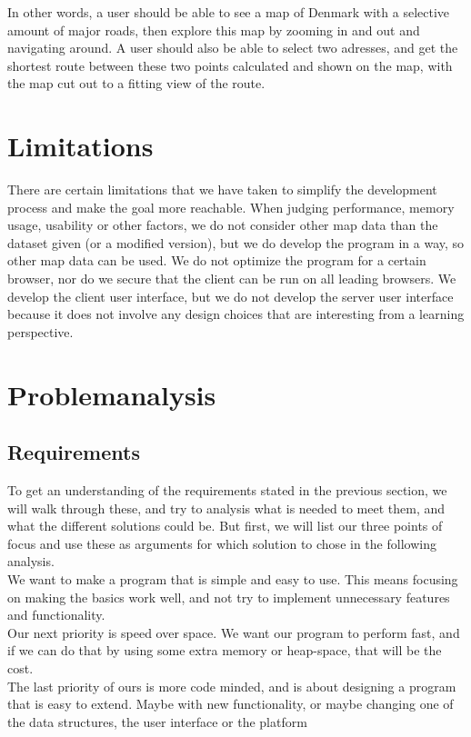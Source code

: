 \documentclass[a4paper,10pt,titlepage]{article}
\begin{document}
		In other words, a user should be able to see a map of Denmark with a selective amount of major roads, then explore this map by zooming in and out and navigating around. A user should also be able to select two adresses, and get the shortest route between these two points calculated and shown on the map, with the map cut out to a fitting view of the route.
		 
	\newpage
	\section{Limitations}
		
		There are certain limitations that we have taken to simplify the development process and make the goal more reachable. When judging performance, memory usage, usability or other factors, we do not consider other map data than the dataset given (or a modified version), but we do develop the program in a way, so other map data can be used. We do not optimize the program for a certain browser, nor do we secure that the client can be run on all leading browsers. We develop the client user interface, but we do not develop the server user interface because it does not involve any design choices that are interesting from a learning perspective.


	\section{Problemanalysis}
		\subsection{Requirements}
To get an understanding of the requirements stated in the previous section, we will walk through these, and try to analysis what is needed to meet them, and what the different solutions could be. But first, we will list our three points of focus and use these as arguments for which solution to chose in the following analysis.\\
We want to make a program that is simple and easy to use. This means focusing on making the basics work well, and not try to implement unnecessary features and functionality.\\

Our next priority is speed over space. We want our program to perform fast, and if we can do that by using some extra     memory or heap-space, that will be the cost.\\

The last priority of ours is more code minded, and is about designing a program that is easy to extend. Maybe with new functionality, or maybe changing one of the data structures, the user interface or the platform\\
\\
\end{document}
